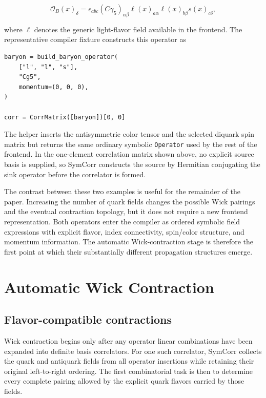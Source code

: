 \documentclass[11pt]{article}
\begin{document}
\begin{equation}
\mathcal O_B(x)_\delta
=
\epsilon_{abc}
(C\gamma_5)_{\alpha\beta}
\ell(x)_{a\alpha}
\ell(x)_{b\beta}
s(x)_{c\delta},
\label{eq:simple_baryon_example}
\end{equation}

where \(\ell\) denotes the generic light-flavor field available in the
frontend. The representative compiler fixture constructs this operator as

\begin{verbatim}
baryon = build_baryon_operator(
    ["l", "l", "s"],
    "Cg5",
    momentum=(0, 0, 0),
)

corr = CorrMatrix([baryon])[0, 0]
\end{verbatim}

The helper inserts the antisymmetric color tensor and the selected diquark spin
matrix but returns the same ordinary symbolic \texttt{Operator} used by the
rest of the frontend. In the one-element correlation matrix shown above, no
explicit source basis is supplied, so SymCorr constructs the source by
Hermitian conjugating the sink operator before the correlator is formed.

The contrast between these two examples is useful for the remainder of the
paper. Increasing the number of quark fields changes the possible Wick
pairings and the eventual contraction topology, but it does not require a new
frontend representation. Both operators enter the compiler as ordered symbolic
field expressions with explicit flavor, index connectivity, spin/color
structure, and momentum information. The automatic Wick-contraction stage is
therefore the first point at which their substantially different propagation
structures emerge.

\section{Automatic Wick Contraction}
\label{sec:wick}

\subsection{Flavor-compatible contractions}

Wick contraction begins only after any operator linear combinations have been
expanded into definite basis correlators. For one such correlator, SymCorr
collects the quark and antiquark fields from all operator insertions while
retaining their original left-to-right ordering. The first combinatorial task
is then to determine every complete pairing allowed by the explicit quark
flavors carried by those fields.
\end{document}

